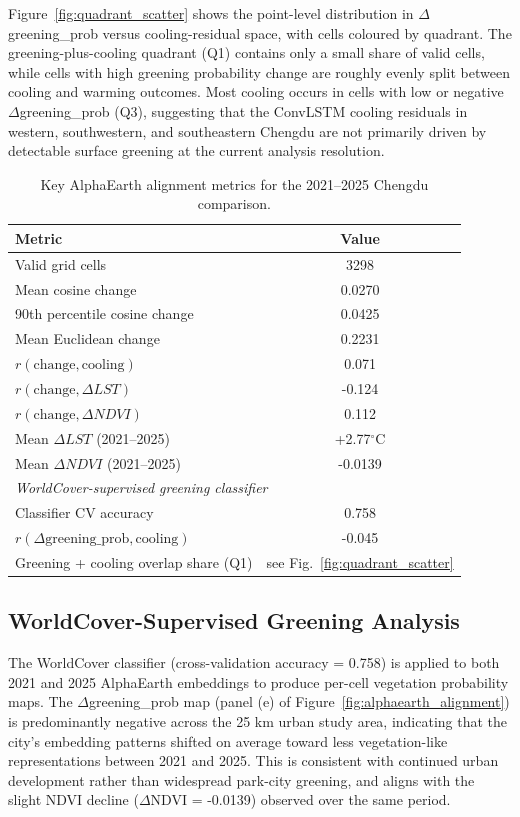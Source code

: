 \documentclass{article}
\begin{document}
Figure~\ref{fig:quadrant_scatter} shows the point-level distribution in
$\Delta$greening\_prob versus cooling-residual space, with cells coloured by
quadrant. The greening-plus-cooling quadrant (Q1) contains only a small share
of valid cells, while cells with high greening probability change are roughly
evenly split between cooling and warming outcomes. Most cooling occurs in cells
with low or negative $\Delta$greening\_prob (Q3), suggesting that the ConvLSTM
cooling residuals in western, southwestern, and southeastern Chengdu are not primarily driven
by detectable surface greening at the current analysis resolution.

\begin{table}[t]
\caption{Key AlphaEarth alignment metrics for the 2021--2025 Chengdu comparison.}
\label{tab:alphaearth_metrics}
\centering
\small
\begin{tabular}{lc}
\toprule
\textbf{Metric} & \textbf{Value} \\
\midrule
Valid grid cells & 3298 \\
Mean cosine change & 0.0270 \\
90th percentile cosine change & 0.0425 \\
Mean Euclidean change & 0.2231 \\
$r(\text{change}, \text{cooling})$ & 0.071 \\
$r(\text{change}, \Delta LST)$ & -0.124 \\
$r(\text{change}, \Delta NDVI)$ & 0.112 \\
Mean $\Delta LST$ (2021--2025) & +2.77$^\circ$C \\
Mean $\Delta NDVI$ (2021--2025) & -0.0139 \\
\midrule
\multicolumn{2}{l}{\textit{WorldCover-supervised greening classifier}} \\
\midrule
Classifier CV accuracy & 0.758 \\
$r(\Delta\text{greening\_prob}, \text{cooling})$ & -0.045 \\
Greening + cooling overlap share (Q1) & see Fig.~\ref{fig:quadrant_scatter} \\
\bottomrule
\end{tabular}
\end{table}

\subsection{WorldCover-Supervised Greening Analysis}

The WorldCover classifier (cross-validation accuracy = 0.758) is applied to
both 2021 and 2025 AlphaEarth embeddings to produce per-cell vegetation
probability maps. The $\Delta$greening\_prob map (panel (e) of
Figure~\ref{fig:alphaearth_alignment}) is predominantly negative across the
25 km urban study area, indicating that the city's embedding patterns shifted
on average toward less vegetation-like representations between 2021 and 2025.
This is consistent with continued urban development rather than widespread
park-city greening, and aligns with the slight NDVI decline ($\Delta$NDVI
= -0.0139) observed over the same period.
\end{document}
